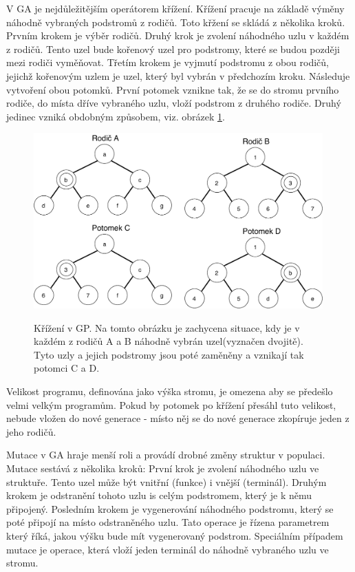 V GA je nejdůležitějším operátorem křížení.
Křížení pracuje na základě výměny náhodně vybraných podstromů z rodičů.
Toto křžení se skládá z několika kroků.
Prvním krokem je výběr rodičů.
Druhý krok je zvolení náhodného uzlu v každém z rodičů.
Tento uzel bude kořenový uzel pro podstromy, které se budou později mezi rodiči vyměňovat.
Třetím krokem je vyjmutí podstromu z obou rodičů, jejichž kořenovým uzlem je uzel, který byl vybrán v předchozím kroku.
Následuje vytvoření obou potomků.
První potomek vznikne tak, že se do stromu prvního rodiče, do místa dříve vybraného uzlu, vloží podstrom z druhého rodiče.
Druhý jedinec vzniká obdobným způsobem, viz. obrázek \ref{fig:GP_krizeni}.

\begin{figure}[h]
    \centering
    {\includegraphics[width=30em]{obrazky-figures/gp_krizeni.pdf}}
    \caption{
    Křížení v GP.
    Na tomto obrázku je zachycena situace, kdy je v každém z rodičů A a B náhodně vybrán uzel(vyznačen dvojitě).
    Tyto uzly a jejich podstromy jsou poté zaměněny a vznikají tak potomci C a D.
    }
    \label{fig:GP_krizeni}
\end{figure}

Velikost programu, definována jako výška stromu, je omezena aby se předešlo velmi velkým programům.
Pokud by potomek po křížení přesáhl tuto velikost, nebude vložen do nové generace - místo něj se do nové generace zkopíruje jeden z jeho rodičů.

Mutace v GA hraje menší roli a provádí drobné změny struktur v populaci.
Mutace sestává z několika kroků:
První krok je zvolení náhodného uzlu ve struktuře.
Tento uzel může být vnitřní (funkce) i vnější (terminál).
Druhým krokem je odstranění tohoto uzlu is celým podstromem, který je k němu připojený.
Posledním krokem je vygenerování náhodného podstromu, který se poté připojí na místo odstraněného uzlu.
Tato operace je řízena parametrem který říká, jakou výšku bude mít vygenerovaný podstrom.
Speciálním případem mutace je operace, která vloží jeden terminál do náhodně vybraného uzlu ve stromu.

